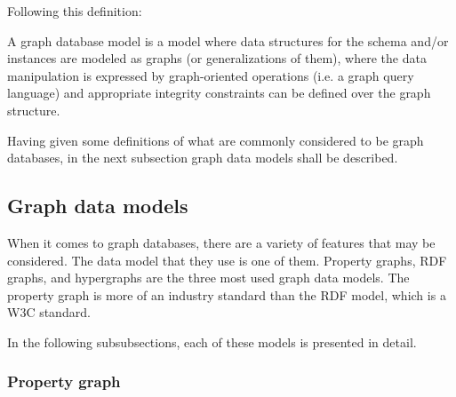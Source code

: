 Following this definition:

\begin{definition}[continues={definition:ofgraphdatabasesbyAnglesandGutierrez}]\label{definition:ofgraphdatabasesbyAnglesandGutierrezcontinued}
	A graph database model is a model where data structures for the schema and/or instances are modeled as graphs (or generalizations of them), where the \gls{data manipulation} is expressed by graph-oriented operations (i.e. a graph query language) and appropriate integrity constraints can be defined over the graph structure. 
\end{definition}

Having given some definitions of what are commonly considered to be graph databases, in the next subsection graph data models shall be described.

\subsection{Graph data models} \label{subsection:LiteratureReview/ReviewofGraphDatabaseSystems/Graphdatamodels}
When it comes to graph databases, there are a variety of features that may be considered.
The data model that they use is one of them.
Property graphs, RDF graphs, and hypergraphs are the three most used graph data models. 
The property graph is more of an industry standard than the RDF model, which is a W3C standard.

In the following subsubsections, each of these models is presented in detail.

\subsubsection{Property graph} \label{subsubsection:LiteratureReview/ReviewofGraphDatabaseSystems/Graphdatamodels/Propertygraph}

